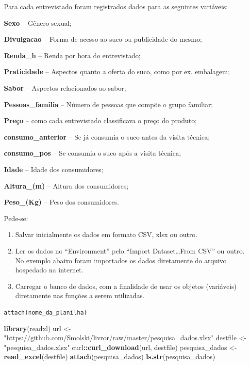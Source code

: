 \documentclass[12pt,brazil,oneside]{book}
\newenvironment{Shaded}{\begin{snugshade}}{\end{snugshade}}
\newcommand{\KeywordTok}[1]{\textcolor[rgb]{0.13,0.29,0.53}{\textbf{#1}}}
\newcommand{\NormalTok}[1]{#1}
\newcommand{\OperatorTok}[1]{\textcolor[rgb]{0.81,0.36,0.00}{\textbf{#1}}}
\newcommand{\StringTok}[1]{\textcolor[rgb]{0.31,0.60,0.02}{#1}}
\begin{document}
Para cada entrevistado foram registrados dados para as seguintes variáveis:

\textbf{Sexo} -- Gênero sexual;

\textbf{Divulgacao} -- Forma de acesso ao suco ou publicidade do mesmo;

\textbf{Renda\_h} -- Renda por hora do entrevistado;

\textbf{Praticidade} -- Aspectos quanto a oferta do suco, como por ex. embalagem;

\textbf{Sabor} -- Aspectos relacionados ao sabor;

\textbf{Pessoas\_familia} -- Número de pessoas que compõe o grupo familiar;

\textbf{Preço} -- como cada entrevistado classificava o preço do produto;

\textbf{consumo\_anterior} -- Se já consumia o suco antes da visita técnica;

\textbf{consumo\_pos} -- Se consumia o suco após a visita técnica;

\textbf{Idade} -- Idade dos consumidores;

\textbf{Altura\_(m)} -- Altura dos consumidores;

\textbf{Peso\_(Kg)} -- Peso dos consumidores.

Pede-se:

\begin{enumerate}
\def\labelenumi{\arabic{enumi}.}
\item
  Salvar inicialmente os dados em formato CSV, xlsx ou outro.
\item
  Ler os dados no ``Environment'' pelo ``Import Dataset\ldots{}From CSV'' ou outro. No exemplo abaixo foram importados os dados diretamente do arquivo hospedado na internet.
\item
  Carregar o banco de dados, com a finalidade de usar os objetos (variáveis) diretamente nas funções a serem utilizadas.
\end{enumerate}

\texttt{attach(nome\_da\_planilha)}

\begin{Shaded}
\begin{Highlighting}[]
\KeywordTok{library}\NormalTok{(readxl)}
\NormalTok{url <-}\StringTok{ "https://github.com/Smolski/livror/raw/master/pesquisa_dados.xlsx"}
\NormalTok{destfile <-}\StringTok{ "pesquisa_dados.xlsx"}
\NormalTok{curl}\OperatorTok{::}\KeywordTok{curl_download}\NormalTok{(url, destfile)}
\NormalTok{pesquisa_dados <-}\StringTok{ }\KeywordTok{read_excel}\NormalTok{(destfile)}
\KeywordTok{attach}\NormalTok{(pesquisa_dados)}
\KeywordTok{ls.str}\NormalTok{(pesquisa_dados)}
\end{Highlighting}
\end{Shaded}
\end{document}
